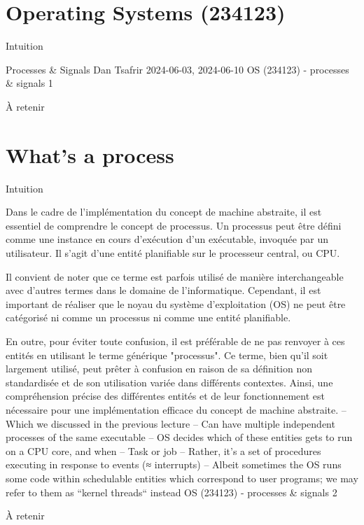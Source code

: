 \documentclass[12pt]{article}
\begin{document}
\section{Operating Systems (234123)}
\begin{myvulga}{Intuition}
\end{myvulga}
Processes \& Signals
Dan Tsafrir
2024-06-03, 2024-06-10
OS (234123) - processes \& signals
1
\begin{aretenir}{À retenir}
\end{aretenir}

\section{What’s a process}
\begin{myvulga}{Intuition}
\end{myvulga}
Dans le cadre de l'implémentation du concept de machine abstraite, il est essentiel de comprendre le concept de processus. Un processus peut être défini comme une instance en cours d'exécution d'un exécutable, invoquée par un utilisateur. Il s'agit d'une entité planifiable sur le processeur central, ou CPU. 

Il convient de noter que ce terme est parfois utilisé de manière interchangeable avec d'autres termes dans le domaine de l'informatique. Cependant, il est important de réaliser que le noyau du système d'exploitation (OS) ne peut être catégorisé ni comme un processus ni comme une entité planifiable. 

En outre, pour éviter toute confusion, il est préférable de ne pas renvoyer à ces entités en utilisant le terme générique "processus". Ce terme, bien qu'il soit largement utilisé, peut prêter à confusion en raison de sa définition non standardisée et de son utilisation variée dans différents contextes. Ainsi, une compréhension précise des différentes entités et de leur fonctionnement est nécessaire pour une implémentation efficace du concept de machine abstraite.
– Which we discussed in the previous lecture
– Can have multiple independent processes of the same executable
– OS decides which of these entities gets to run on a CPU core, and when
– Task or job
– Rather, it’s a set of procedures executing in response to events
(≈ interrupts)
– Albeit sometimes the OS runs some code within schedulable entities
which correspond to user programs; we may refer to them as
“kernel threads“ instead
OS (234123) - processes \& signals
2
\begin{aretenir}{À retenir}
\end{aretenir}
\end{document}
